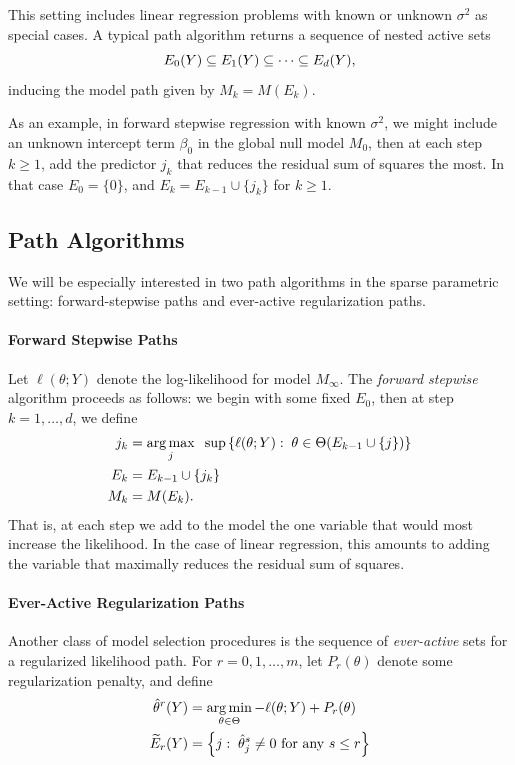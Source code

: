 \documentclass{article}
\begin{document}
This setting includes linear regression problems with known or unknown $\sigma^2$ as special cases. A typical path algorithm returns a sequence of nested active sets 
\[
E_0(Y) \subseteq E_1(Y) \subseteq \cdots \subseteq E_d(Y),
\]
inducing the model path given by $M_k = M(E_k)$. 

As an example, in forward stepwise regression with known $\sigma^2$, we might include an unknown intercept term $\beta_0$ in the global null model $M_0$, then at each step $k\geq 1$, add the predictor $j_k$ that reduces the residual sum of squares the most. In that case $E_0 = \{0\}$, and $E_k = E_{k-1} \cup \{j_k\}$ for $k\geq 1$.

\subsection{Path Algorithms}

We will be especially interested in two path algorithms in the sparse parametric setting: forward-stepwise paths and ever-active regularization paths.

\paragraph{Forward Stepwise Paths}
Let $\ell(\theta; Y)$ denote the log-likelihood for model
$M_\infty$. The {\em forward stepwise} algorithm proceeds as follows: we begin with some fixed $E_0$, then at step $k=1,\ldots,d$, we define
\begin{align}\label{eq:forwardDef_start}
j_k &= \operatorname*{arg\,max}_j \;\;\sup \left\{\ell(\theta; Y):\; \theta\in\Theta(E_{k-1} \cup \{j\})\right\} \\
E_k &= E_{k-1} \cup \{j_k\}\\\label{eq:forwardDef_end}
M_k &= M(E_k).
\end{align}
That is, at each step we add to the model the one variable that would most increase the likelihood. In the case of linear regression, this amounts to adding the variable that maximally reduces the residual sum of squares. 

\paragraph{Ever-Active Regularization Paths}
Another class of model selection procedures is the sequence of {\em ever-active} sets for a regularized likelihood path. For $r=0,1,\ldots,m$, let $P_r(\theta)$ denote some regularization penalty, and define
\begin{align}\label{eq:regPathDef_start}
  \hat\theta^{r}(Y) &= 
  \operatorname*{arg\,min}_{\theta\in\Theta} -\ell(\theta; Y) + P_r(\theta) \\
  \widetilde{E}_r(Y) &= \left\{j:\; \hat\theta_j^s \neq 0 
    \text{ for any } s \leq r \right\}
\end{align}
\end{document}
